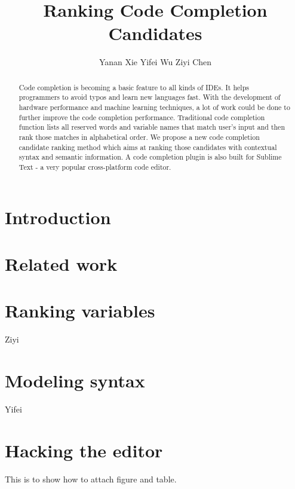 \documentclass[prodmode,acmtecs]{acmsmall} %
\begin{document}

\title{Ranking Code Completion Candidates}
\author{Yanan Xie
Yifei Wu
Ziyi Chen
}

\begin{abstract}
Code completion is becoming a basic feature to all kinds of IDEs. It helps programmers to avoid typos and learn new languages fast. With the development of hardware performance and machine learning techniques, a lot of work could be done to further improve the code completion performance. Traditional code completion function lists all reserved words and variable names that match user’s input and then rank those matches in alphabetical order. We propose a new code completion candidate ranking method which aims at ranking those candidates with contextual syntax and semantic information. A code completion plugin is also built for Sublime Text - a very popular cross-platform code editor.
\end{abstract}


\maketitle


\section{Introduction}
\section{Related work}
\section{Ranking variables}
Ziyi
\section{Modeling syntax}
Yifei
\section{Hacking the editor}



This is to show how to attach figure and table.
\end{document}
